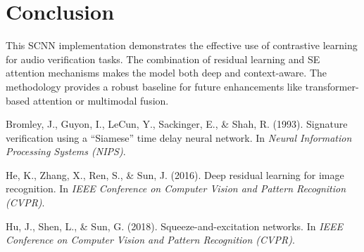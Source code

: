 \documentclass[12pt]{article}
\begin{document}
\section{Conclusion}
This SCNN implementation demonstrates the effective use of contrastive learning for audio verification tasks. The combination of residual learning and SE attention mechanisms makes the model both deep and context-aware. The methodology provides a robust baseline for future enhancements like transformer-based attention or multimodal fusion.

\begin{thebibliography}{9}

Bromley, J., Guyon, I., LeCun, Y., Sackinger, E., \& Shah, R. (1993). 
Signature verification using a ``Siamese'' time delay neural network. In \textit{Neural Information Processing Systems (NIPS)}.

He, K., Zhang, X., Ren, S., \& Sun, J. (2016). 
Deep residual learning for image recognition. In \textit{IEEE Conference on Computer Vision and Pattern Recognition (CVPR)}.

Hu, J., Shen, L., \& Sun, G. (2018). 
Squeeze-and-excitation networks. In \textit{IEEE Conference on Computer Vision and Pattern Recognition (CVPR)}.

\end{thebibliography}
\end{document}
